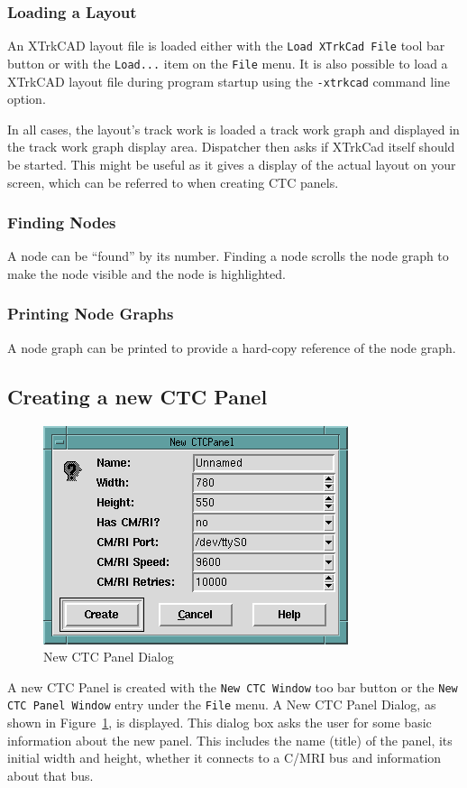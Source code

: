 \subsubsection{Loading a Layout}

An XTrkCAD layout file is loaded either with the \verb=Load XTrkCad File=
tool bar button or with the \verb=Load...= item on the \verb=File=
menu. It is also possible to load a XTrkCAD layout file during
program startup using the \verb=-xtrkcad= command line option.

In all cases, the layout's track work is loaded a track work graph and
displayed in the track work graph display area.  Dispatcher then asks if
XTrkCad itself should be started.  This might be useful as it gives a
display of the actual layout on your screen, which can be referred to
when creating CTC panels.

\subsubsection{Finding Nodes}

A node can be ``found'' by its number.  Finding a node scrolls the node
graph to make the node visible and the node is highlighted.

\subsubsection{Printing Node Graphs}

A node graph can be printed to provide a hard-copy reference of the node
graph.

\subsection{Creating a new CTC Panel}
\label{sect:dispatcher:creatingCTCPanels}

\begin{figure}[hbpt]
\begin{centering}
\includegraphics{DISPNewCTCPanel.png}
\caption{New CTC Panel Dialog}
\label{fig:dispatcher:newCTCPanel}
\end{centering}
\end{figure}
A new CTC Panel is created with the \verb=New CTC Window= too bar button or
the \verb=New CTC Panel Window= entry under the \verb=File= menu.  A New
CTC Panel Dialog, as shown in Figure~\ref{fig:dispatcher:newCTCPanel}, is
displayed. This dialog box asks the user for some basic information
about the new panel.  This includes the name (title) of the panel, its
initial width and height, whether it connects to a C/MRI bus and
information about that bus.

